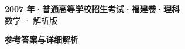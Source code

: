 \documentclass[zihao=-4, a4paper]{ctexart}
\begin{document}
\begin{center}
  {\Large\bfseries 2007 年·普通高等学校招生考试·福建卷·理科}\\[4pt]
  {\large 数学 · 解析版}
\end{center}
\medskip
{}

\clearpage
{}
\begin{center}{\Large\bfseries 参考答案与详细解析}\end{center}
\medskip

\end{document}
